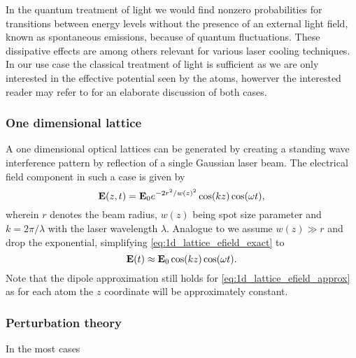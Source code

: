 In the quantum treatment of light we would find nonzero probabilities for
transitions between energy levels without the presence of an external light
field, known as spontaneous emissions, because of quantum fluctuations.
These dissipative effects are among others relevant for various laser cooling
techniques. In our use case the classical treatment of light is sufficient as
we are only interested in the effective potential seen by the atoms, howerver
the interested reader may refer to \cite{Gerry2004} for an elaborate
discussion of both cases.

\subsubsection{One dimensional lattice}

A one dimensional optical lattices can be generated by creating a standing
wave interference pattern by reflection of a single Gaussian laser beam. The
electrical field component in such a case is given by
\begin{equation}
  \vb{E}(z,t)
  =\vb{E}_0e^{-2r^2/w(z)^2}\cos(kz)\cos(\omega t)
  \label{eq:1d_lattice_efield_exact},
\end{equation}
wherein $r$ denotes the beam radius, $w(z)$ being spot size parameter and
$k=2\pi/\lambda$ with the laser wavelength $\lambda$. Analogue to
\cite[p.127]{Rom2009} we assume $w(z)\gg r$ and drop the exponential,
simplifying \cref{eq:1d_lattice_efield_exact} to
\begin{equation}
  \vb{E}(t)
  \approx\vb{E}_0\cos(kz)\cos(\omega t)
  \label{eq:1d_lattice_efield_approx}.
\end{equation}
Note that the dipole approximation still holds for
\cref{eq:1d_lattice_efield_approx} as for each atom the $z$ coordinate
will be approximately constant.

\subsubsection{Perturbation theory}

In the most cases

